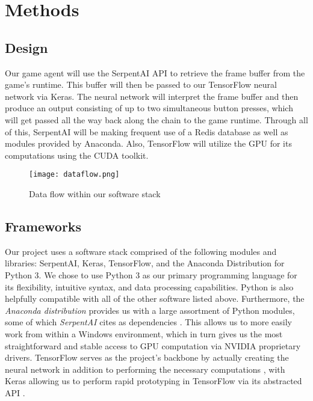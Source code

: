 \chapter{Methods}


\section{Design}

Our game agent will use the SerpentAI API to retrieve the frame buffer from the game's runtime. This buffer will then be passed to our TensorFlow neural network via Keras. The neural network will interpret the frame buffer and then produce an output consisting of up to two simultaneous button presses, which will get passed all the way back along the chain to the game runtime. Through all of this, SerpentAI will be making frequent use of a Redis database as well as modules provided by Anaconda. Also, TensorFlow will utilize the GPU for its computations using the CUDA toolkit.

\begin{figure}
	\caption{Data flow within our software stack}
	\centering
		\texttt{[image: dataflow.png]} \\
\end{figure}


\section{Frameworks}

Our project uses a software stack comprised of the following modules and libraries: SerpentAI, Keras, TensorFlow, and the Anaconda Distribution for Python 3. We chose to use Python 3 as our primary programming language for its flexibility, intuitive syntax, and data processing capabilities. Python is also helpfully compatible with all of the other software listed above. Furthermore, the {\it Anaconda distribution} provides us with a large assortment of Python modules, some of which {\it SerpentAI} cites as dependencies \cite{SerpentAI}. This allows us to more easily work from within a Windows environment, which in turn gives us the most straightforward and stable access to GPU computation via NVIDIA proprietary drivers. TensorFlow serves as the project's backbone by actually creating the neural network in addition to performing the necessary computations \cite{TensorFlow}, with Keras allowing us to perform rapid prototyping in TensorFlow via its abstracted API \cite{Keras}.

